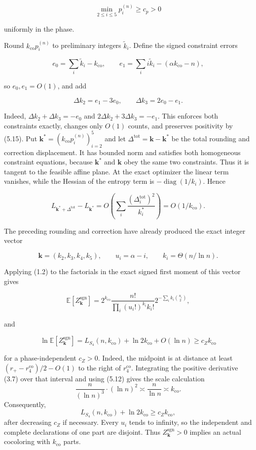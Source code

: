 \documentclass[11pt,reqno]{amsart}
\newcommand{\Exp}[1]{\mathbb{E}\!\left[#1\right]}
\begin{document}
\[
 \min_{2\le i\le5}p_i^{(n)}\ge c_p>0                    \tag{5.15}
\]

uniformly in the phase.

Round \(k_{\mathrm{co}}p_i^{(n)}\) to preliminary integers \(\widetilde k_i\).
Define the signed constraint errors

\[
 e_0=\sum_i\widetilde k_i-k_{\mathrm{co}},\qquad
 e_1=\sum_i i\widetilde k_i-(\alpha k_{\mathrm{co}}-n),
\]

so \(e_0,e_1=O(1)\), and add

\[
 \Delta k_2=e_1-3e_0,\qquad
 \Delta k_3=2e_0-e_1.                                   \tag{5.16}
\]

Indeed, \(\Delta k_2+\Delta k_3=-e_0\) and
\(2\Delta k_2+3\Delta k_3=-e_1\). This enforces both constraints
exactly, changes only \(O(1)\) counts, and preserves positivity by
(5.15).  Put
\(\mathbf k^*=(k_{\mathrm{co}}p_i^{(n)})_{i=2}^5\) and let
\(\Delta^{\mathrm{tot}}=\mathbf k-\mathbf k^*\) be the total rounding
and correction displacement.  It has bounded norm and satisfies both
homogeneous constraint equations, because \(\mathbf k^*\) and
\(\mathbf k\) obey the same two constraints.  Thus it is tangent to the
feasible affine plane.  At the exact optimizer the linear term vanishes, while
the Hessian of the entropy term is
\(-\operatorname{diag}(1/k_i)\).  Hence

\[
 L_{\mathbf k^*+\Delta^{\mathrm{tot}}}
 -L_{\mathbf k^*}
 =O\!\left(\sum_i\frac{(\Delta_i^{\mathrm{tot}})^2}{k_i^*}\right)
 =O(1/k_{\mathrm{co}}).
\]

The preceding rounding and correction have already produced the exact
integer vector

\[
 \mathbf k=(k_2,k_3,k_4,k_5),\qquad
 u_i=\alpha-i,\qquad k_i=\Theta(n/{\ln n}).                    \tag{5.17}
\]

Applying (1.2) to the factorials in the exact signed first moment of this
vector gives

\[
 \Exp{Z_{\mathbf k}^{\mathrm{sgn}}}
 =2^{k_{\mathrm{co}}}\frac{n!}{\prod_i(u_i!)^{k_i}k_i!}
   2^{-\sum_i k_i\binom{u_i}{2}},                        \tag{5.18}
\]

and

\[
 \ln \Exp{Z_{\mathbf k}^{\mathrm{sgn}}}
 =L_{S_4}(n,k_{\mathrm{co}})+{\ln 2}k_{\mathrm{co}}+O({\ln n})
 \ge c_Zk_{\mathrm{co}}                                          \tag{5.19}
\]

for a phase-independent \(c_Z>0\). Indeed, the midpoint is at distance
at least \((r_+-r_4^{\mathrm{co}})/2-O(1)\) to the right of
\(r_4^{\mathrm{co}}\).  Integrating the positive derivative (3.7) over
that interval and using (5.12) gives the scale calculation
\[
 \frac{n}{(\ln n)^3}\cdot(\ln n)^2
 \asymp\frac n{\ln n}\asymp k_{\mathrm{co}}.
\]
Consequently,
\[
 L_{S_4}(n,k_{\mathrm{co}})+{\ln 2}k_{\mathrm{co}}
 \ge c_Zk_{\mathrm{co}},
\]
after decreasing \(c_Z\) if necessary. Every
\(u_i\) tends to infinity, so the independent and complete
declarations of one part are disjoint. Thus
\(Z_{\mathbf k}^{\mathrm{sgn}}>0\)
implies an actual cocoloring with \(k_{\mathrm{co}}\) parts.
\end{document}
